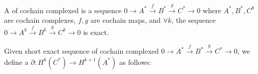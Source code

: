 A  of cochain complexed is a sequence  $ 0\rightarrow A^*\xrightarrow{f}B^*\xrightarrow{g}C^*\rightarrow 0 $ where  $ A^*,B^*,C^8 $ are cochain complexes,  $ f,g $ are cochain maps, and  $ \forall k $, the sequence  $ 0\rightarrow A^k\xrightarrow{f}B^k\xrightarrow{g}C^k\rightarrow 0 $     is exact.
\tikzset{external/export=false}
\begin{center}
\end{center}
\tikzset{external/export=true}

Given short exact sequence of cochain complexed  $ 0\rightarrow A^*\xrightarrow{f}B^*\xrightarrow{g}C^*\rightarrow 0 $, we define a   $ \partial:H^k(C^*)\rightarrow H^{k+1}(A^*) $ as follows:


